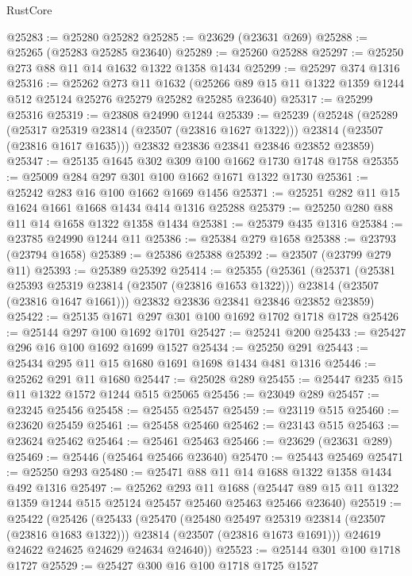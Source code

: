 \begin{lexlean}{RustCore}
\begin{coremodule}
@25283 := @25280 @25282
@25285 := @23629 (@23631 @269)
@25288 := @25265 (@25283 @25285 @23640)
@25289 := @25260 @25288
@25297 := @25250 @273 @88 @11 @14 @1632 @1322 @1358 @1434
@25299 := @25297 @374 @1316
@25316 := @25262
    @273
    @11
    @1632
    (@25266 @89 @15 @11 @1322 @1359 @1244 @512 @25124 @25276 @25279 @25282 @25285 @23640)
@25317 := @25299 @25316
@25319 := @23808 @24990 @1244
@25339 := @25239
    (@25248
      (@25289
        (@25317 @25319 @23814 (@23507 (@23816 @1627 @1322)))
        @23814
        (@23507 (@23816 @1617 @1635)))
      @23832
      @23836
      @23841
      @23846
      @23852
      @23859)
@25347 := @25135 @1645 @302 @309 @100 @1662 @1730 @1748 @1758
@25355 := @25009 @284 @297 @301 @100 @1662 @1671 @1322 @1730
@25361 := @25242 @283 @16 @100 @1662 @1669 @1456
@25371 := @25251 @282 @11 @15 @1624 @1661 @1668 @1434 @414 @1316 @25288
@25379 := @25250 @280 @88 @11 @14 @1658 @1322 @1358 @1434
@25381 := @25379 @435 @1316
@25384 := @23785 @24990 @1244 @11
@25386 := @25384 @279 @1658
@25388 := @23793 (@23794 @1658)
@25389 := @25386 @25388
@25392 := @23507 (@23799 @279 @11)
@25393 := @25389 @25392
@25414 := @25355
    (@25361
      (@25371
        (@25381 @25393 @25319 @23814 (@23507 (@23816 @1653 @1322)))
        @23814
        (@23507 (@23816 @1647 @1661)))
      @23832
      @23836
      @23841
      @23846
      @23852
      @23859)
@25422 := @25135 @1671 @297 @301 @100 @1692 @1702 @1718 @1728
@25426 := @25144 @297 @100 @1692 @1701
@25427 := @25241 @200
@25433 := @25427 @296 @16 @100 @1692 @1699 @1527
@25434 := @25250 @291
@25443 := @25434 @295 @11 @15 @1680 @1691 @1698 @1434 @481 @1316
@25446 := @25262 @291 @11 @1680
@25447 := @25028 @289
@25455 := @25447 @235 @15 @11 @1322 @1572 @1244 @515 @25065
@25456 := @23049 @289
@25457 := @23245 @25456
@25458 := @25455 @25457
@25459 := @23119 @515
@25460 := @23620 @25459
@25461 := @25458 @25460
@25462 := @23143 @515
@25463 := @23624 @25462
@25464 := @25461 @25463
@25466 := @23629 (@23631 @289)
@25469 := @25446 (@25464 @25466 @23640)
@25470 := @25443 @25469
@25471 := @25250 @293
@25480 := @25471 @88 @11 @14 @1688 @1322 @1358 @1434 @492 @1316
@25497 := @25262
    @293
    @11
    @1688
    (@25447 @89 @15 @11 @1322 @1359 @1244 @515 @25124 @25457 @25460 @25463 @25466 @23640)
@25519 := @25422
    (@25426
      (@25433
        (@25470
          (@25480 @25497 @25319 @23814 (@23507 (@23816 @1683 @1322)))
          @23814
          (@23507 (@23816 @1673 @1691)))
        @24619
        @24622
        @24625
        @24629
        @24634
        @24640))
@25523 := @25144 @301 @100 @1718 @1727
@25529 := @25427 @300 @16 @100 @1718 @1725 @1527

\end{coremodule}
\end{lexlean}
